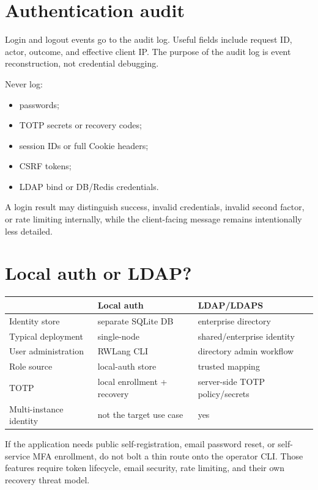 \section{Authentication audit}

Login and logout events go to the audit log. Useful fields include request ID, actor, outcome, and effective client IP. The purpose of the audit log is event reconstruction, not credential debugging.

Never log:

\begin{itemize}
  \item passwords;
  \item TOTP secrets or recovery codes;
  \item session IDs or full Cookie headers;
  \item CSRF tokens;
  \item LDAP bind or DB/Redis credentials.
\end{itemize}

A login result may distinguish success, invalid credentials, invalid second factor, or rate limiting internally, while the client-facing message remains intentionally less detailed.

\section{Local auth or LDAP?}

\begin{center}
\begin{tabularx}{\textwidth}{@{}lYY@{}}
\toprule
 & Local auth & LDAP/LDAPS \\
\midrule
Identity store & separate SQLite DB & enterprise directory \\
Typical deployment & single-node & shared/enterprise identity \\
User administration & RWLang CLI & directory admin workflow \\
Role source & local-auth store & trusted mapping \\
TOTP & local enrollment + recovery & server-side TOTP policy/secrets \\
Multi-instance identity & not the target use case & yes \\
\bottomrule
\end{tabularx}
\end{center}

If the application needs public self-registration, email password reset, or self-service MFA enrollment, do not bolt a thin route onto the operator CLI. Those features require token lifecycle, email security, rate limiting, and their own recovery threat model.

